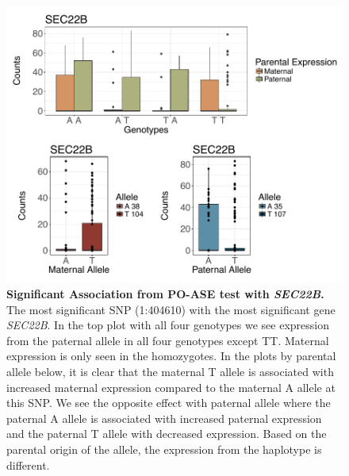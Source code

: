 \begin{figure}[!htb]
\centering \includegraphics[width=5in]{img/ch04/SEC22B.pdf}
\caption[Significant Association from PO-ASE test with \emph{SEC22B}.]{\textbf{Significant Association from PO-ASE test with \emph{SEC22B}.} The most significant SNP (1:404610) with the most significant gene \emph{SEC22B}. In the top plot with all four genotypes we see expression from the paternal allele in all four genotypes except TT. Maternal expression is only seen in the homozygotes. In the plots by parental allele below, it is clear that the maternal T allele is associated with increased maternal expression compared to the maternal A allele at this SNP.  We see the opposite effect with paternal allele where the paternal A allele is associated with increased paternal expression and the paternal T allele with decreased expression. Based on the parental origin of the allele, the expression from the haplotype is different. }
\label{fig:SEC22B}
\end{figure}


